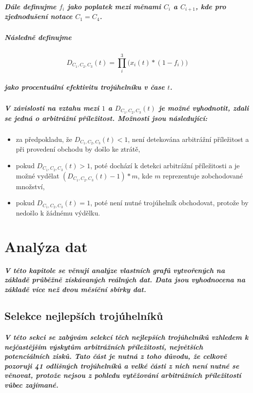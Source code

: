 \documentclass[thesis=B,czech]{FITthesis}[2019/03/21]
\begin{document}
\paragraph{
Dále definujme \(f_i\) jako poplatek mezi měnami \(C_i\) a \(C_{i+1}\), kde pro zjednodušení notace \(C_1 = C_4\).
}
\paragraph{
Následně definujme
}
\[D_{C_1,C_2,C_3}(t) = \prod_i^3\Big(x_i(t)*(1-f_i)\Big)\]
\paragraph{
jako procentuální efektivitu trojúhelníku v čase \(t\).
}
\paragraph{
V závislosti na vztahu mezi \(1\) a \(D_{C_1,C_2,C_3}(t)\) je možné vyhodnotit, zdali se jedná o arbitrážní příležitost. Možnosti jsou následující:
}
\begin{itemize}
    \item za předpokladu, že \(D_{C_1,C_2,C_3}(t) < 1\), není detekována arbitrážní příležitost a při provedení obchodu by došlo ke ztrátě,
    \item pokud \(D_{C_1,C_2,C_3}(t) > 1\), poté dochází k detekci arbitrážní příležitosti a je možné vydělat \( (D_{C_1,C_2,C_3}(t) - 1) * m\), kde \(m\) reprezentuje zobchodované množství,
    \item pokud \(D_{C_1,C_2,C_3}(t) = 1\), poté není nutné trojúhelník obchodovat, protože by nedošlo k žádnému výdělku.
\end{itemize}
\chapter{Analýza dat}
\paragraph{
V této kapitole se věnuji analýze vlastních grafů vytvořených na základě průběžně získávaných reálných dat. Data jsou vyhodnocena na základě více než dvou měsíční sbírky dat.
}
\section{Selekce nejlepších trojúhelníků}
\paragraph{
V této sekci se zabývám selekcí těch nejlepších trojúhelníků vzhledem k nejčastějším výskytům arbitrážních příležitostí, největších potenciálních zisků. Tato část je nutná z toho důvodu, že celkově pozoruji 41 odlišných trojúhelníků a velké části z nich není nutné se věnovat, protože nejsou z pohledu vytěžování arbitrážních příležitostí vůbec zajímané.
}
\end{document}
